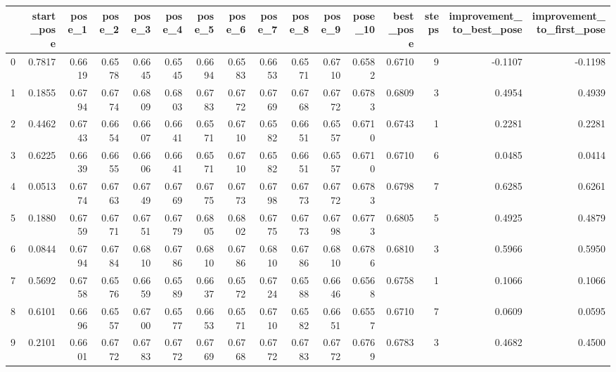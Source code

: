 \begin{tabular}{lrrrrrrrrrrrrrrr}
\toprule
{} &  start\_pose &  pose\_1 &  pose\_2 &  pose\_3 &  pose\_4 &  pose\_5 &  pose\_6 &  pose\_7 &  pose\_8 &  pose\_9 &  pose\_10 &  best\_pose &  steps &  improvement\_to\_best\_pose &  improvement\_to\_first\_pose \\
\midrule
0   &      0.7817 &  0.6619 &  0.6578 &  0.6645 &  0.6545 &  0.6694 &  0.6583 &  0.6653 &  0.6571 &  0.6710 &   0.6582 &     0.6710 &      9 &                   -0.1107 &                    -0.1198 \\
1   &      0.1855 &  0.6794 &  0.6774 &  0.6809 &  0.6803 &  0.6783 &  0.6772 &  0.6769 &  0.6768 &  0.6772 &   0.6783 &     0.6809 &      3 &                    0.4954 &                     0.4939 \\
2   &      0.4462 &  0.6743 &  0.6654 &  0.6607 &  0.6641 &  0.6571 &  0.6710 &  0.6582 &  0.6651 &  0.6557 &   0.6710 &     0.6743 &      1 &                    0.2281 &                     0.2281 \\
3   &      0.6225 &  0.6639 &  0.6655 &  0.6606 &  0.6641 &  0.6571 &  0.6710 &  0.6582 &  0.6651 &  0.6557 &   0.6710 &     0.6710 &      6 &                    0.0485 &                     0.0414 \\
4   &      0.0513 &  0.6774 &  0.6763 &  0.6749 &  0.6769 &  0.6775 &  0.6773 &  0.6798 &  0.6773 &  0.6772 &   0.6783 &     0.6798 &      7 &                    0.6285 &                     0.6261 \\
5   &      0.1880 &  0.6759 &  0.6771 &  0.6751 &  0.6779 &  0.6805 &  0.6802 &  0.6775 &  0.6773 &  0.6798 &   0.6773 &     0.6805 &      5 &                    0.4925 &                     0.4879 \\
6   &      0.0844 &  0.6794 &  0.6784 &  0.6810 &  0.6786 &  0.6810 &  0.6786 &  0.6810 &  0.6786 &  0.6810 &   0.6786 &     0.6810 &      3 &                    0.5966 &                     0.5950 \\
7   &      0.5692 &  0.6758 &  0.6576 &  0.6659 &  0.6589 &  0.6637 &  0.6572 &  0.6724 &  0.6588 &  0.6646 &   0.6568 &     0.6758 &      1 &                    0.1066 &                     0.1066 \\
8   &      0.6101 &  0.6696 &  0.6557 &  0.6700 &  0.6577 &  0.6653 &  0.6571 &  0.6710 &  0.6582 &  0.6651 &   0.6557 &     0.6710 &      7 &                    0.0609 &                     0.0595 \\
9   &      0.2101 &  0.6601 &  0.6772 &  0.6783 &  0.6772 &  0.6769 &  0.6768 &  0.6772 &  0.6783 &  0.6772 &   0.6769 &     0.6783 &      3 &                    0.4682 &                     0.4500 \\

\end{tabular}
